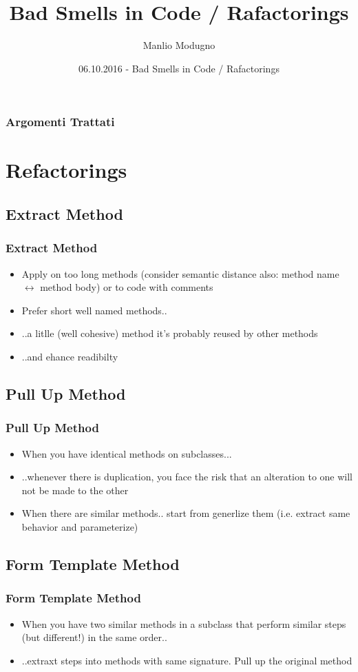 \documentclass{beamer}
\title{Bad Smells in Code / Rafactorings}
\author{Manlio Modugno}
\institute[GMTechnologies]
\date[06.10.2016] 
{06.10.2016 - Bad Smells in Code / Rafactorings}
\begin{document}
\begin{frame}
  \titlepage
\end{frame}

\begin{frame}
  \frametitle{Argomenti Trattati}
  \tableofcontents
\end{frame}

\section{Refactorings}
\subsection{Extract Method}
\begin{frame}
  \frametitle{Extract Method}
  \begin{itemize}
	\item<+-> Apply on too long methods (consider semantic distance also: method name $\leftrightarrow$ method body) or to code with comments
	\item<+-> Prefer short well named methods..
	\item<+-> ..a litlle (well cohesive) method it's probably reused by other methods
    \item<+-> ..and ehance readibilty
  \end{itemize}
\end{frame}

\subsection{Pull Up Method}
\begin{frame}
  \frametitle{Pull Up Method}
  \begin{itemize}
	\item<+-> When you have identical methods on subclasses...
	\item<+-> ..whenever there is duplication, you face the risk that an alteration to one will not be made to the other
	\item<+-> When there are similar methods.. start from generlize them (i.e. extract same behavior and parameterize)
  \end{itemize}
\end{frame}

\subsection{Form Template Method}
\begin{frame}
  \frametitle{Form Template Method}
  \begin{itemize}
	\item<+-> When you have two similar methods in a subclass that perform similar steps (but different!) in the same order..
	\item<+-> ..extraxt steps into methods with same signature. Pull up the original method
  \end{itemize}
\end{frame}
\end{document}

